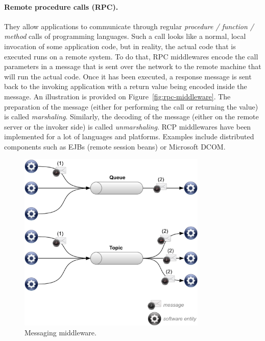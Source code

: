 \paragraph{Remote procedure calls (RPC).}
They allow applications to communicate through regular \emph{procedure / function / method} calls of programming languages. Such a call looks like a normal, local invocation of some application code, but in reality, the actual code that is executed runs on a remote system. To do that, RPC middlewares encode the call parameters in a message that is sent over the network to the remote machine that will run the actual code. Once it has been executed, a response message is sent back to the invoking application with a return value being encoded inside the message. An illustration is provided on Figure~\ref{fig:rpc-middleware}. The preparation of the message (either for performing the call or returning the value) is called \emph{marshaling}. Similarly, the decoding of the message (either on the remote server or the invoker side) is called \emph{unmarshaling}. RCP middlewares have been implemented for a lot of languages and platforms. Examples include distributed components such as EJBs (remote session beans) or Microsoft DCOM.
  
\begin{figure}[htbp]
    \centering
    \includegraphics[width=0.8\textwidth]{content/web-services/messaging-middleware}
    \caption{Messaging middleware.}
    \label{fig:messaging-middleware}
\end{figure}
  
